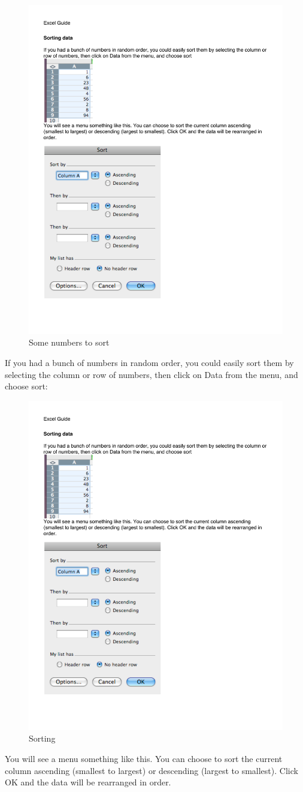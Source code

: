 \begin{figure}
      \includegraphics[width=.5\linewidth]{LabmanualFigures/Excel11.pdf}
      \caption{Some numbers to sort}
      \label{fig:excel11}
\end{figure}
 

If you had a bunch of numbers in random order, you could easily sort them by selecting the column or row of numbers, then click on Data from the menu, and choose sort:

\begin{figure}
      \includegraphics[width=.5\linewidth]{LabmanualFigures/Excel12.pdf}
      \caption{Sorting}
      \label{fig:excel12}
\end{figure}
 


 
You will see a menu something like this. You can choose to sort the current column ascending (smallest to largest) or descending (largest to smallest). Click OK and the data will be rearranged in order.
  

